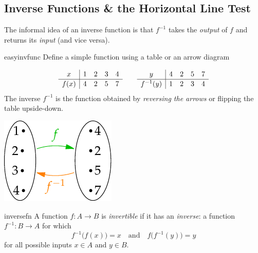 \clearpage




\subsection{Inverse Functions \& the Horizontal Line Test}

The informal idea of an inverse function is that $f^{-1}$ takes the \emph{output} of $f$ and returns its \emph{input} (and vice versa).

\begin{example}{}{easyinvfunc}
	Define a simple function using a table or an arrow diagram\par
	\begin{minipage}[t]{0.74\linewidth}\vspace{-17pt}
		\[
			\def\arraystretch{1.1}
			\begin{array}{c|cccc}
				x&1&2&3&4\\\hline
				f(x)&4&2&5&7
			\end{array}
			\qquad
			\begin{array}{c|cccc}
				y&4&2&5&7\\\hline
				f^{-1}(y)&1&2&3&4
			\end{array}
		\]
		The inverse $f^{-1}$ is the function obtained by \emph{reversing the arrows} or flipping the table upside-down.
	\end{minipage}
	\hfill
	\begin{minipage}[t]{0.25\linewidth}\vspace{-17pt}
		\flushright
		\includegraphics{inverse-easy}
	\end{minipage}
\end{example}


\begin{defn}{}{inversefn}
	A function $f:A\to B$ is \emph{invertible} if it has an \emph{inverse}: a function $f^{-1}:B\to A$ for which
	\[
		f^{-1}\bigl(f(x)\bigr)=x\quad\text{and}\quad f\bigl(f^{-1}(y)\bigr)=y \tag{$\ast$}
	\]
	for all possible inputs $x\in A$ and $y\in B$.
\end{defn}

